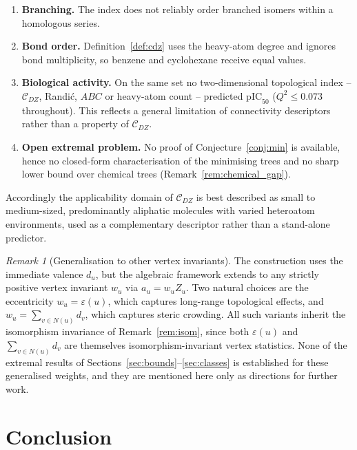 \documentclass[11pt,a4paper]{article}
\theoremstyle{plain}
\theoremstyle{definition}
\theoremstyle{remark}
\newtheorem{remark}[theorem]{Remark}
\newcommand{\CDZ}{\mathcal{C}_{DZ}}
\begin{document}
\begin{enumerate}
\item \textbf{Branching.} The index does not reliably order branched isomers
      within a homologous series.
\item \textbf{Bond order.} Definition~\ref{def:cdz} uses the heavy-atom degree
      and ignores bond multiplicity, so benzene and cyclohexane receive equal
      values.
\item \textbf{Biological activity.} On the same set no two-dimensional
      topological index -- $\CDZ$, Randi\'c, $ABC$ or heavy-atom count --
      predicted $\mathrm{pIC}_{50}$ ($Q^2\le0.073$ throughout). This reflects a
      general limitation of connectivity descriptors rather than a property of
      $\CDZ$.
\item \textbf{Open extremal problem.} No proof of Conjecture~\ref{conj:min} is
      available, hence no closed-form characterisation of the minimising trees
      and no sharp lower bound over chemical trees
      (Remark~\ref{rem:chemical_gap}).
\end{enumerate}

Accordingly the applicability domain of $\CDZ$ is best described as small to
medium-sized, predominantly aliphatic molecules with varied heteroatom
environments, used as a complementary descriptor rather than a stand-alone
predictor.

\begin{remark}[Generalisation to other vertex invariants]
\label{rem:generalisation}
The construction uses the immediate valence $d_u$, but the algebraic framework
extends to any strictly positive vertex invariant $w_u$ via $a_u=w_uZ_u$. Two
natural choices are the eccentricity $w_u=\varepsilon(u)$, which captures
long-range topological effects, and $w_u=\sum_{v\in N(u)}d_v$, which captures
steric crowding. All such variants inherit the isomorphism invariance of
Remark~\ref{rem:isom}, since both $\varepsilon(u)$ and $\sum_{v\in N(u)}d_v$ are
themselves isomorphism-invariant vertex statistics. None of the extremal results
of Sections~\ref{sec:bounds}--\ref{sec:classes} is established for these
generalised weights, and they are mentioned here only as directions for further
work.
\end{remark}

\section{Conclusion}
\label{sec:conclusion}
\end{document}
